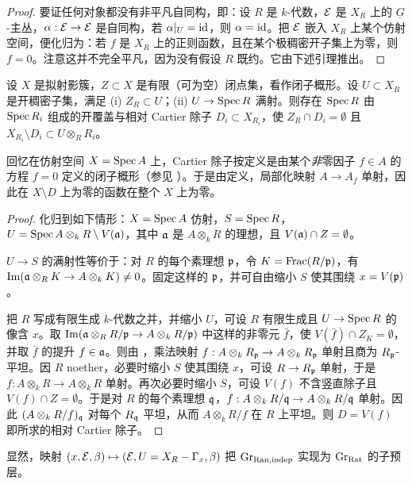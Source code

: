 \begin{proof}
要证任何对象都没有非平凡自同构，即：设 $R$ 是 $k$-代数，${\mathcal E}$ 是 $X_R$ 上的 $\underline G$-主丛，${\alpha}: {\mathcal E}\to {\mathcal E}$ 是自同构，若 ${\alpha}|_U={\operatorname{id}}$，则 ${\alpha}={\operatorname{id}}$。把 ${\mathcal E}$ 嵌入 $X_R$ 上某个仿射空间，便化归为：若 $f$ 是 $X_R$ 上的正则函数，且在某个极稠密开子集上为零，则 $f=0$。注意这并不完全平凡，因为没有假设 $R$ 既约。它由下述引理推出。
\end{proof}

\begin{lem}\label{very dense vs Cartier}
设 $X$ 是拟射影簇，$Z\subset X$ 是有限（可为空）闭点集，看作闭子概形。设 $U\subset X_R$ 是开稠密子集，满足 (i) $Z_R\subset U$；(ii) $U\to \operatorname{Spec} R$ 满射。则存在 $\operatorname{Spec} R$ 由 $\operatorname{Spec} R_i$ 组成的开覆盖与相对 Cartier 除子 $D_i\subset X_{R_i}$，使 $Z_R\cap D_i=\emptyset$ 且 $X_{R_i}\setminus D_i\subset U\otimes_RR_i$。
\end{lem}

回忆在仿射空间 $X=\operatorname{Spec} A$ 上，Cartier 除子按定义是由某个\emph{非}零因子 $f\in A$ 的方程 $f=0$ 定义的闭子概形（参见 \cite[Tag01WQ]{St}）。于是由定义，局部化映射 $A\to A_f$ 单射，因此在 $X\setminus D$ 上为零的函数在整个 $X$ 上为零。

\begin{proof}
化归到如下情形：$X=\operatorname{Spec} A$ 仿射，$S=\operatorname{Spec} R$，$U=\operatorname{Spec} A\otimes_k R\setminus V({\mathfrak a})$，其中 ${\mathfrak a}$ 是 $A\otimes_k R$ 的理想，且 $V({\mathfrak a})\cap Z=\emptyset$。

$U\to S$ 的满射性等价于：对 $R$ 的每个素理想 ${\mathfrak p}$，令 $K=\operatorname{Frac}(R/{\mathfrak p})$，有 $\operatorname{Im}({\mathfrak a}\otimes_RK\to A\otimes_kK)\neq 0$。固定这样的 ${\mathfrak p}$，并可自由缩小 $S$ 使其围绕 $x=V({\mathfrak p})$。

把 $R$ 写成有限生成 $k$-代数之并，并缩小 $U$，可设 $R$ 有限生成且 $U\to \operatorname{Spec} R$ 的像含 $x$。取 $\operatorname{Im}({\mathfrak a}\otimes_R R/{\mathfrak p}\to A\otimes_k R/{\mathfrak p})$ 中这样的非零元 $\bar{f}$，使 $V(\bar{f})\cap Z_K=\emptyset$，并取 $\bar f$ 的提升 $f\in {\mathfrak a}$。则由 \cite[Tag00ME]{St}，乘法映射 $f: A\otimes_k R_{\mathfrak p}\to A\otimes_k R_{\mathfrak p}$ 单射且商为 $R_{\mathfrak p}$-平坦。因 $R$ noether，必要时缩小 $S$ 使其围绕 $x$，可设 $R\to R_{\mathfrak p}$ 单射，于是 $f:A\otimes_k R\to A\otimes_k R$ 单射。再次必要时缩小 $S$，可设 $V(f)$ 不含竖直除子且 $V(f)\cap Z=\emptyset$。于是对 $R$ 的每个素理想 ${\mathfrak q}$，$f: A\otimes_k R/{\mathfrak q}\to A\otimes_k R/{\mathfrak q}$ 单射。因此 $(A\otimes_k R/f)_{\mathfrak q}$ 对每个 $R_{\mathfrak q}$ 平坦，从而 $A\otimes_kR/f$ 在 $R$ 上平坦。则 $D=V(f)$ 即所求的相对 Cartier 除子。
\end{proof}

显然，映射 $(x,{\mathcal E},\beta)\mapsto ({\mathcal E},U=X_R-{\Gamma}_x,\beta)$ 把 ${\operatorname{Gr}}_{\operatorname{Ran},\operatorname{indep}}$ 实现为 ${\operatorname{Gr}}_{\operatorname{Rat}}$ 的子预层。

